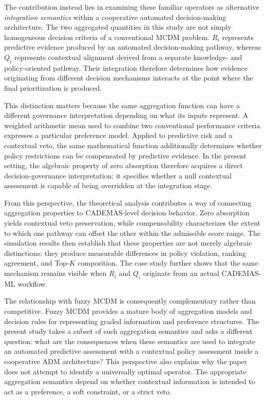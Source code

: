 \documentclass[mathematics,article,submit,moreauthors]{Definitions/mdpi}
\begin{document}
The contribution instead lies in examining these familiar operators as
alternative \emph{integration semantics} within a cooperative automated
decision-making architecture. The two aggregated quantities in this study
are not simply homogeneous decision criteria of a conventional MCDM
problem. $R_i$ represents predictive evidence produced by an automated
decision-making pathway, whereas $Q_i$ represents contextual alignment
derived from a separate knowledge- and policy-oriented pathway. Their
integration therefore determines how evidence originating from different
decision mechanisms interacts at the point where the final prioritization
is produced.

This distinction matters because the same aggregation function can have a
different governance interpretation depending on what its inputs represent.
A weighted arithmetic mean used to combine two conventional performance
criteria expresses a particular preference model. Applied to predictive
risk and a contextual veto, the same mathematical function additionally
determines whether policy restrictions can be compensated by predictive
evidence. In the present setting, the algebraic property of zero absorption
therefore acquires a direct decision-governance interpretation: it specifies
whether a null contextual assessment is capable of being overridden at the
integration stage.

From this perspective, the theoretical analysis contributes a way of
connecting aggregation properties to CADEMAS-level decision behavior.
Zero absorption yields contextual veto preservation, while compensability
characterizes the extent to which one pathway can offset the other within
the admissible score range. The simulation results then establish that
these properties are not merely algebraic distinctions: they produce
measurable differences in policy violation, ranking agreement, and Top-$K$
composition. The case study further shows that the same mechanism remains
visible when $R_i$ and $Q_i$ originate from an actual CADEMAS-ML workflow.

The relationship with fuzzy MCDM is consequently complementary rather than
competitive. Fuzzy MCDM provides a mature body of aggregation models and
decision rules for representing graded information and preference
structures. The present study takes a subset of such aggregation semantics
and asks a different question: what are the consequences when these
semantics are used to integrate an automated predictive assessment with a
contextual policy assessment inside a cooperative ADM architecture? This
perspective also explains why the paper does not attempt to identify a
universally optimal operator. The appropriate aggregation semantics depend
on whether contextual information is intended to act as a preference,
a soft constraint, or a strict veto.
\end{document}
